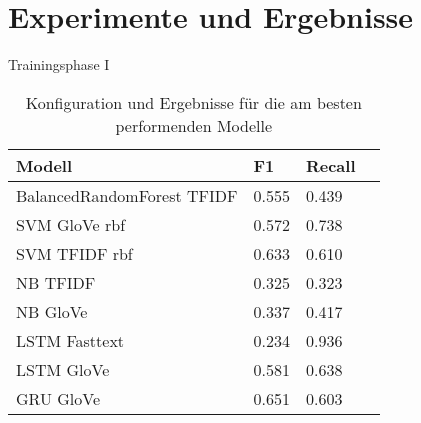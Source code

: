 \documentclass[aspectratio=169]{beamer} %
\begin{document}
\section{Experimente und Ergebnisse}
\begin{frame}{Trainingsphase I}

\begin{table}[h]
    \centering
    \begin{tabular}{|p{5.5cm}|p{2cm}|p{2cm}|p{2cm}|}
        \hline
            \textbf{Modell} & \textbf{F1} & \textbf{Recall} \\
        \hline
            BalancedRandomForest TFIDF & 0.555  & 0.439 \\
            SVM GloVe rbf & 0.572 & 0.738 \\
            SVM TFIDF rbf & 0.633 & 0.610 \\
            NB TFIDF & 0.325 & 0.323  \\
            NB GloVe & 0.337 & 0.417  \\
            LSTM Fasttext & 0.234 & 0.936 \\
            LSTM GloVe & 0.581 & 0.638  \\
            GRU GloVe & 0.651 & 0.603\\
        \hline
\end{tabular}
\caption{Konfiguration und Ergebnisse für die am besten performenden Modelle}
\label{tab:model_performance}
\end{table}
\end{frame}
\end{document}
